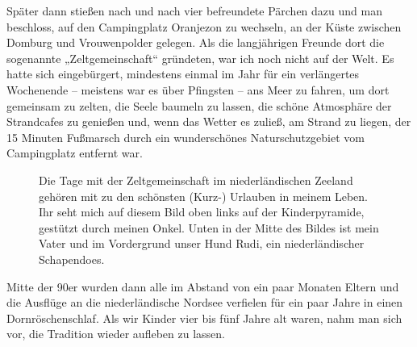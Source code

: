 \documentclass[fontsize=14pt,a4paper,headinclude,DIV=calc,automark]{scrbook}
\begin{document}
Später dann stießen nach und nach vier befreundete Pärchen dazu und man beschloss, auf den Campingplatz Oranjezon zu wechseln, an der Küste zwischen Domburg und Vrouwenpolder gelegen. Als die langjährigen Freunde dort die sogenannte „Zeltgemeinschaft“ gründeten, war ich noch nicht auf der Welt. Es hatte sich eingebürgert, mindestens einmal im Jahr für ein verlängertes Wochenende – meistens war es über Pfingsten – ans Meer zu fahren, um dort gemeinsam zu zelten, die Seele baumeln zu lassen, die schöne Atmosphäre der Strandcafes zu genießen und, wenn das Wetter es zuließ, am Strand zu liegen, der 15 Minuten Fußmarsch durch ein wunderschönes Naturschutzgebiet vom Campingplatz entfernt war.

\setlength{\fboxsep}{0pt}    %
\setlength{\fboxrule}{0.2pt} %
\begin{figure}[ht]
    \raggedright
    \caption{Die Tage mit der Zeltgemeinschaft im niederländischen Zeeland gehören mit zu den schönsten (Kurz-) Urlauben in meinem Leben. Ihr seht mich auf diesem Bild oben links auf der Kinderpyramide, gestützt durch meinen Onkel. Unten in der Mitte des Bildes ist mein Vater und im Vordergrund unser Hund Rudi, ein niederländischer Schapendoes.}
    \label{fig:zeltgemeinschaft3}
\end{figure}

Mitte der 90er wurden dann alle im Abstand von ein paar Monaten Eltern und die Ausflüge an die niederländische Nordsee verfielen für ein paar Jahre in einen Dornröschenschlaf. Als wir Kinder vier bis fünf Jahre alt waren, nahm man sich vor, die Tradition wieder aufleben zu lassen.
\end{document}
